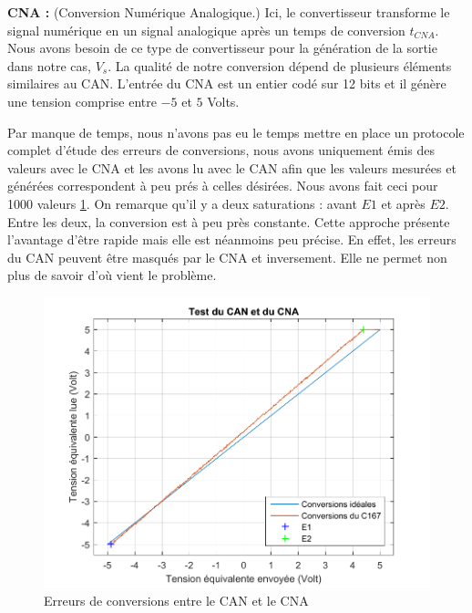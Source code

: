 \hspace{3mm} \textbf{CNA :} (Conversion Numérique Analogique.) Ici, le convertisseur transforme le signal numérique en un signal analogique après un temps de conversion $t_{CNA}$. Nous avons besoin de ce type de convertisseur pour la génération de la sortie dans notre cas, $V_{s}$. La qualité de notre conversion dépend de plusieurs éléments similaires au CAN. L'entrée du CNA est un entier codé sur 12 bits et il génère une tension comprise entre $-5$ et $5$ Volts. 


Par manque de temps, nous n'avons pas eu le temps mettre en place un protocole complet d'étude des erreurs de conversions, nous avons uniquement émis des valeurs avec le CNA et les avons lu avec le CAN afin que les valeurs mesurées et générées correspondent à peu prés à celles désirées. Nous avons fait ceci pour 1000 valeurs \ref{fig:errCAN}. On remarque qu'il y a deux saturations : avant $E1$ et après $E2$. Entre les deux, la conversion est à peu près constante. Cette approche présente l'avantage d'être rapide mais elle est néanmoins peu précise. En effet, les erreurs du CAN peuvent être masqués par le CNA et inversement. Elle ne permet non plus de savoir d'où vient le problème. 
\begin{figure}[!ht]
\centering 		
\includegraphics[width=.6\textwidth]{./V/images/CAN_CNA_mesures.pdf}
\caption{\label{fig:errCAN}Erreurs de conversions entre le CAN et le CNA}
\end{figure}
\newpage

